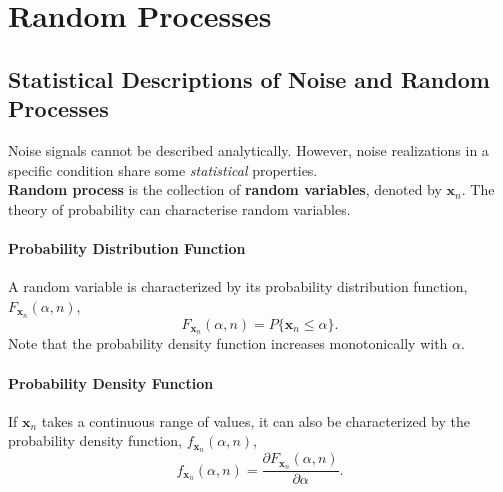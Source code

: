 \section{Random Processes}
\subsection{Statistical Descriptions of Noise and Random Processes}
Noise signals cannot be described analytically. However, noise realizations in a specific condition share some \textit{statistical} properties. \\

\textbf{Random process} is the collection of \textbf{random variables}, denoted by $\mathbf{x}_n$. The theory of probability can characterise random variables.

\paragraph{Probability Distribution Function} A random variable is characterized by its probability distribution function, $F_{\mathbf{x}_n}(\alpha, n)$,
\[
    F_{\mathbf{x}_n}(\alpha, n) = P\{\mathbf{x}_n\leq \alpha\}.
\]
Note that the probability density function increases monotonically with $\alpha$.

\paragraph{Probability Density Function} If $\mathbf{x}_{n}$ takes a continuous range of values, it can also be characterized by the probability density function, $f_{\mathbf{x}_n}(\alpha, n)$,
\[
    f_{\mathbf{x}_n}(\alpha, n) = \frac{\partial F_{\mathbf{x}_n}(\alpha, n)}{\partial \alpha}.
\]
